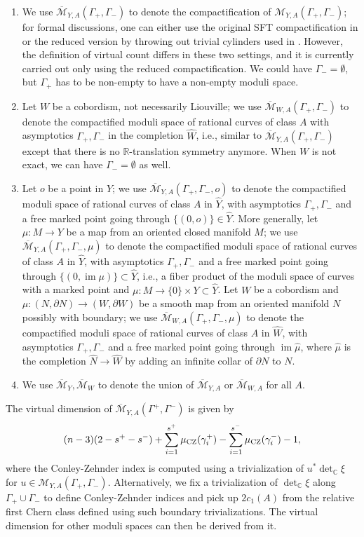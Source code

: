 \documentclass[11pt]{amsart}
\numberwithin{equation}{section}
\def\R{\mathbb{R}}
\def\C{{\mathbb C}}
\def\cM{{\mathcal M}}
\def\CZ{\rm CZ}
\DeclareMathOperator{\Ima}{im}
\begin{document}
\begin{enumerate}
    \item We use $\overline{\cM}_{Y,A}(\Gamma_+,\Gamma_-)$ to denote the compactification of $\cM_{Y,A}(\Gamma_+,\Gamma_-)$; for formal discussions, one can either use the original SFT compactification in \cite{zbMATH02062477} or the reduced version by throwing out trivial cylinders used in \cite{zbMATH07085531,zbMATH07656377,moreno2024landscape}. However, the definition of virtual count differs in these two settings, and it is currently carried out only using the reduced compactification. We could have $\Gamma_-=\emptyset$, but $\Gamma_+$ has to be non-empty to have a non-empty moduli space.
    \item Let $W$ be a cobordism, not necessarily Liouville; we use  $\overline{\cM}_{W,A}(\Gamma_+,\Gamma_-)$ to denote the compactified moduli space of rational curves of class $A$ with asymptotics $\Gamma_+,\Gamma_-$ in the completion $\widehat{W}$, i.e., similar to $\overline{\cM}_{Y,A}(\Gamma_+,\Gamma_-)$ except that there is no $\R$-translation symmetry anymore. When $W$ is not exact, we can have $\Gamma_-=\emptyset$ as well. 
    \item Let $o$ be a point in $Y$; we use $\overline{\cM}_{Y,A}(\Gamma_+,\Gamma_-,o)$ to denote the compactified moduli space of rational curves of class $A$ in $\widehat{Y}$, with asymptotics $\Gamma_+,\Gamma_-$ and a free marked point going through $\{(0,o)\}\in \widehat{Y}$. More generally, let $\mu:M\to Y$ be a map from an oriented closed manifold $M$; we use $\overline{\cM}_{Y,A}(\Gamma_+,\Gamma_-,\mu)$ to denote the compactified moduli space of rational curves of class $A$ in $\widehat{Y}$, with asymptotics $\Gamma_+,\Gamma_-$ and a free marked point going through $\{(0,\Ima \mu)\}\subset \widehat{Y}$, i.e., a fiber product of the moduli space of curves with a marked point and $\mu:M\to \{0\}\times Y\subset \widehat{Y}$. Let $W$ be a cobordism and $\mu:(N,\partial N)\to (W,\partial W)$ be a smooth map from an oriented manifold $N$ possibly with boundary; we use $\overline{\cM}_{W,A}(\Gamma_+,\Gamma_-,\mu)$ to denote the compactified moduli space of rational curves of class $A$ in $\widehat{W}$, with asymptotics $\Gamma_+,\Gamma_-$ and a free marked point going through $\Ima \widehat{\mu}$, where $\widehat{\mu}$ is the completion $\widehat{N}\to \widehat{W}$ by adding an infinite collar of $\partial N$ to $N$.
    \item We use $\overline{\cM}_Y,\overline{\cM}_W$ to denote the union of $\overline{\cM}_{Y,A}$ or $\overline{\cM}_{W,A}$ for all $A$.
\end{enumerate}
The virtual dimension of $\overline{\cM}_{Y,A}(\Gamma^+,\Gamma^-)$ is given by
$$(n-3)(2-s^+-s^-)+\sum_{i=1}^{s^+}\mu_{\CZ}(\gamma_i^+) - \sum_{i=1}^{s^-}\mu_{\CZ}(\gamma_i^-)-1,$$
where the Conley-Zehnder index is computed using a trivialization of $u^*\det_{\C}\xi$ for $u\in \cM_{Y,A}(\Gamma_+,\Gamma_-)$. Alternatively, we fix a trivialization of $\det_{\C}\xi$ along $\Gamma_+\cup \Gamma_-$ to define Conley-Zehnder indices and pick up $2c_1(A)$ from the relative first Chern class defined using such boundary trivializations. The virtual dimension for other moduli spaces can then be derived from it. 
\end{document}
